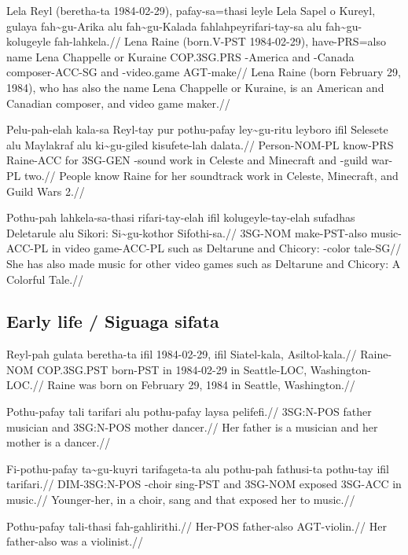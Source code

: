 \ex
\begingl
\gla  Lela Reyl (beretha-ta 1984-02-29), pafay-sa=thasi leyle Lela Sapel o Kureyl, gulaya fah\~{}gu-Arika alu fah\~{}gu-Kalada fahlahpeyrifari-tay-sa alu fah\~{}gu-kolugeyle fah-lahkela.//
\glb  Lena Raine (born.V-PST 1984-02-29), have-PRS=also name Lena Chappelle or Kuraine COP.3SG.PRS \agradj{}-America and \agradj{}-Canada composer-ACC-SG and \agradj{}-video.game AGT-make//
\glft Lena Raine (born February 29, 1984), who has also the name Lena Chappelle or Kuraine, is an American and Canadian composer, and video game maker.//
\endgl 
\xe

\ex
\begingl 
\gla  Pelu-pah-elah kala-sa Reyl-tay pur pothu-pafay ley\~{}gu-ritu leyboro ifil Selesete alu Maylakraf alu ki\~{}gu-giled kisufete-lah dalata.//
\glb  Person-NOM-PL know-PRS Raine-ACC for 3SG-GEN \agradj{}-sound work in Celeste and Minecraft and \agradj{}-guild war-PL two.//
\glft People know Raine for her soundtrack work in Celeste, {} Minecraft, and Guild Wars 2.//
\endgl 
\xe

\ex
\begingl
\gla  Pothu-pah lahkela-sa-thasi rifari-tay-elah ifil kolugeyle-tay-elah sufadhas Deletarule alu Sikori: Si\~{}gu-kothor Sifothi-sa.//
\glb  3SG-NOM make-PST-also music-ACC-PL in video game-ACC-PL such as Deltarune and Chicory: \agradj{}-color tale-SG//
\glft She has also made music for other video games such as Deltarune and Chicory: A Colorful Tale.//
\endgl 
\xe

\subsection{Early life / Siguaga sifata}

\ex
\begingl
\gla  Reyl-pah  gulata      beretha-ta ifil 1984-02-29, ifil Siatel-kala, Asiltol-kala.//
\glb  Raine-NOM COP.3SG.PST born-PST   in   1984-02-29  in   Seattle-LOC, Washington-LOC.//
\glft Raine was born on February 29, 1984 in Seattle, Washington.//
\endgl
\xe

\ex
\begingl
\gla  Pothu-pafay tali  tarifari alu pothu-pafay laysa  pelifefi.//
\glb  3SG:N-POS father musician and 3SG:N-POS mother dancer.//
\glft Her father is a musician and her mother is a dancer.//
\endgl
\xe

\ex
\begingl
\gla  Fi-pothu-pafay ta\~{}gu-kuyri tarifageta-ta alu pothu-pah fathusi-ta pothu-tay ifil tarifari.//
\glb  DIM-3SG:N-POS \agradj{}-choir sing-PST and 3SG-NOM exposed 3SG-ACC in music.//
\glft Younger-her, in a choir, sang and that exposed her to music.//
\endgl
\xe

\ex
\begingl
\gla  Pothu-pafay tali-thasi  fah-gahlirithi.//
\glb  Her-POS father-also AGT-violin.//
\glft Her father-also was a violinist.//
\endgl
\xe

